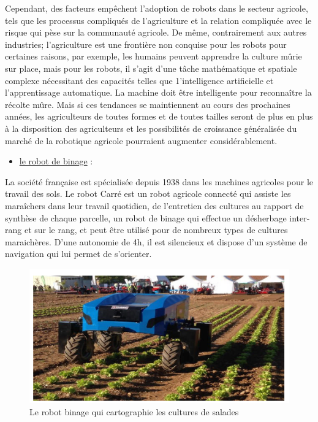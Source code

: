 \begin{flushleft}
	Cependant, des facteurs empêchent l'adoption de robots dans le secteur agricole, tels que les processus compliqués de l'agriculture et la relation compliquée avec le risque qui pèse sur la communauté agricole. De même, contrairement aux autres industries; l'agriculture est une frontière non conquise pour les robots pour certaines raisons, par exemple, les humains peuvent apprendre la culture mûrie sur place, mais pour les robots, il s'agit d'une tâche mathématique et spatiale complexe nécessitant des capacités telles que 1'intelligence artificielle et l'apprentissage automatique. La machine doit être intelligente pour reconnaître la récolte mûre. Mais si ces tendances se maintiennent au cours des prochaines années, les agriculteurs de toutes formes et de toutes tailles seront de plus en plus à la disposition des agriculteurs et les possibilités de croissance généralisée du marché de la robotique agricole pourraient augmenter considérablement.
		\begin{itemize}
			\item \underline{le robot de binage} :
		\end{itemize}
	La société française est spécialisée depuis 1938 dans les machines
	agricoles pour le travail des sols. Le robot Carré est un robot agricole connecté qui assiste les maraîchers dans leur travail quotidien, de l’entretien des cultures au rapport de synthèse de chaque parcelle, un robot de binage qui effectue un
	désherbage inter-rang et sur le rang, et peut être utilisé pour de nombreux types de cultures maraichères. D'une autonomie de 4h, il est silencieux et dispose d'un système de navigation qui lui permet de s'orienter.
	\begin{figure}[h]
		\centering
		\includegraphics{chapitres/images/robot-binage.PNG}
		\caption{Le robot binage qui cartographie les cultures de salades}
		\label{fig:labelname}
	\end{figure}
	

\end{flushleft}
